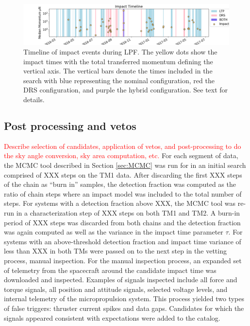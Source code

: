 \documentclass[twocolumn, trackchanges]{aastex62}
\newcommand{\red}[1]{\textcolor{red}{#1}}
\begin{document}
\begin{figure}[t]
\includegraphics[width=\textwidth]{figures/timeline.png} 
\caption{Timeline of impact events during LPF. The yellow dots show the impact times with the total transferred momentum defining the vertical axis. The vertical bars denote the times included in the search with blue representing the nominal configuration, red the DRS configuration, and purple the hybrid configuration. See text for details. \label{fig:timeline}}
\end{figure}

\subsection{Post processing and vetos}\label{sec:vetos}
\red{Describe selection of candidates, application of vetos, and post-processing to do the sky angle conversion, sky area computation, etc.}
For each segment of data, the MCMC tool described in Section \ref{sec:MCMC} was run for in an initial search comprised of XXX steps on the TM1 data. After discarding the first XXX steps of the chain as ``burn in'' samples, the detection fraction was computed as the ratio of chain steps where an impact model was included to the total number of steps.  For systems with a detection fraction above XXX, the MCMC tool was re-run in a characterization step of XXX steps on both TM1 and TM2. A burn-in period of XXX steps was discarded from both chains and the detection fraction was again computed as well as the variance in the impact time parameter $\tau$.  For systems with an above-threshold detection fraction and impact time variance of less than XXX in both TMs were passed on to the next step in the vetting process, manual inspection.  For the manual inspection process, an expanded set of telemetry from the spacecraft around the candidate impact time was downloaded and inspected.  Examples of signals inspected include all force and torque signals, all position and attitude signals, selected voltage levels, and internal telemetry of the micropropulsion system. This process yielded two types of false triggers: thruster current spikes and data gaps. Candidates for which the signals appeared consistent with expectations were added to the catalog.
\end{document}
